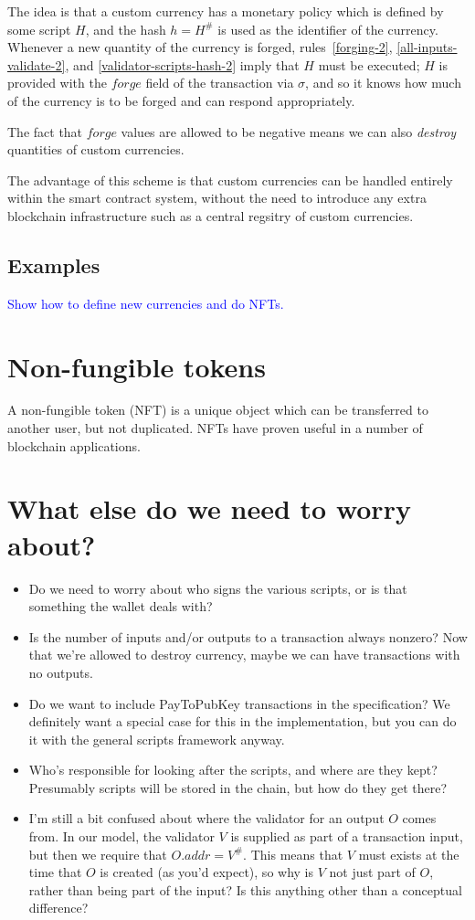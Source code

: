 \documentclass[a4paper]{article}
\newcommand{\blue}[1]{\textcolor{blue}{#1}}
\newcommand{\s}{\textsf}  %
\theoremstyle{definition}  %
\newcommand{\mi}[1]{\ensuremath{\mathit{#1}}}
\newcommand{\forge}{\mi{forge}}
\newcommand{\addr}{\mi{addr}}
\begin{document}
The idea is that a custom currency has a monetary policy which is
defined by some script $H$, and the hash $h = H^{\#}$ is used as the
identifier of the currency.  Whenever a new quantity of the currency
is forged, rules~\ref{forging-2}, \ref{all-inputs-validate-2}, and
\ref{validator-scripts-hash-2} imply that $H$ must be executed; $H$ is
provided with the \forge{} field of the transaction via $\sigma$, and
so it knows how much of the currency is to be forged and can respond
appropriately.

The fact that \forge{} values are allowed to be negative means we can
also \textit{destroy} quantities of custom currencies.

The advantage of this scheme is that custom currencies can be handled
entirely within the smart contract system, without the need to
introduce any extra blockchain infrastructure such as a central
regsitry of custom currencies.


\subsection{Examples}
\blue{Show how to define new currencies and do NFTs.}

\section{Non-fungible tokens}
A non-fungible token (NFT) is a unique object which can be transferred
to another user, but not duplicated.  NFTs have proven useful in a number
of blockchain applications.


\section{What else do we need to worry about?}
\begin{itemize}
\item Do we need to worry about who signs the various scripts, or is that
  something the wallet deals with?
\item Is the number of inputs and/or outputs to a transaction always nonzero?
  Now that we're allowed to destroy currency, maybe we can have transactions
  with no outputs.
\item Do we want to include \s{PayToPubKey} transactions in the specification?
  We definitely want a special case for this in the implementation, but you
  can do it with the general scripts framework anyway.
\item Who's responsible for looking after the scripts, and where are they kept?
  Presumably scripts will be stored in the chain, but how do they get there?
\item I'm still a bit confused about where the validator for an output
  $O$ comes from.  In our model, the validator $V$ is supplied as part
  of a transaction input, but then we require that $O.\addr = V^\#$.
  This means that $V$ must exists at the time that $O$ is created (as
  you'd expect), so why is $V$ not just part of $O$, rather than being
  part of the input?  Is this anything other than a conceptual
  difference?
  
\end{itemize}
\end{document}
